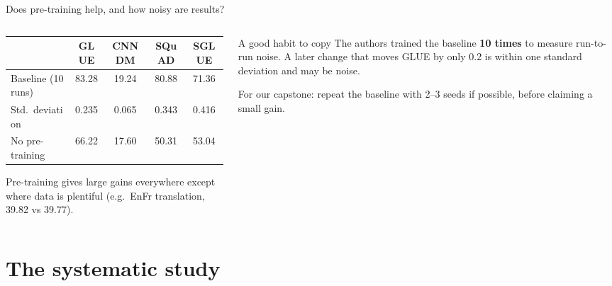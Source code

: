 \documentclass[aspectratio=169,11pt]{beamer}
\begin{document}
\begin{frame}{Does pre-training help, and how noisy are results?}
  \begin{columns}[T]
    \begin{column}{0.56\textwidth}
      \footnotesize
      \begin{tabular}{@{}lcccc@{}}
        \toprule
        & GLUE & CNNDM & SQuAD & SGLUE\\
        \midrule
        Baseline (10 runs) & 83.28 & 19.24 & 80.88 & 71.36\\
        Std.\ deviation & 0.235 & 0.065 & 0.343 & 0.416\\
        No pre-training & 66.22 & 17.60 & 50.31 & 53.04\\
        \bottomrule
      \end{tabular}
      \vspace{2mm}

      \small
      Pre-training gives large gains everywhere except where data is plentiful (e.g.\ EnFr translation, 39.82 vs 39.77).
    \end{column}
    \begin{column}{0.4\textwidth}
      \begin{exampleblock}{A good habit to copy}
        \small
        The authors trained the baseline \textbf{10 times} to measure run-to-run noise. A later change that moves GLUE by only 0.2 is within one standard deviation and may be noise.
        \vspace{1mm}

        For our capstone: repeat the baseline with 2--3 seeds if possible, before claiming a small gain.
      \end{exampleblock}
    \end{column}
  \end{columns}
\end{frame}

\section{The systematic study}
\end{document}
